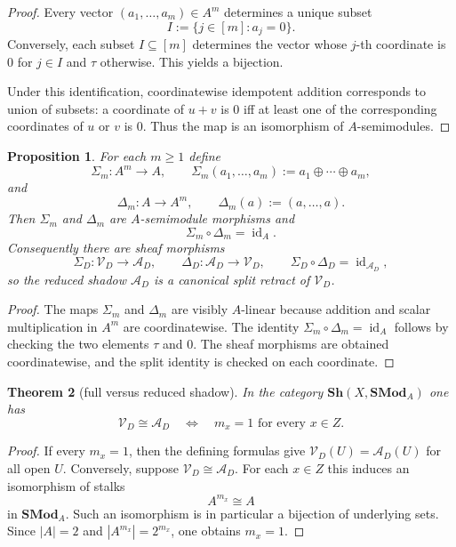\documentclass[11pt,a4paper]{article}
\newtheorem{theorem}{Theorem}[section]
\newtheorem{proposition}[theorem]{Proposition}
\theoremstyle{definition}
\theoremstyle{remark}
\DeclareMathOperator{\id}{id}
\newcommand{\SModA}{\mathbf{SMod}_A}
\newcommand{\taup}{\tau}
\newcommand{\Vd}{\mathcal V_D}
\newcommand{\Ad}{\mathcal A_D}
\begin{document}
\begin{proof}
Every vector $(a_1,\dots,a_m)\in A^m$ determines a unique subset
\[
I:=\{j\in[m]:a_j=0\}.
\]
Conversely, each subset $I\subseteq [m]$ determines the vector whose $j$-th coordinate is $0$ for $j\in I$ and $\taup$ otherwise. This yields a bijection.

Under this identification, coordinatewise idempotent addition corresponds to union of subsets: a coordinate of $u+v$ is $0$ iff at least one of the corresponding coordinates of $u$ or $v$ is $0$. Thus the map is an isomorphism of $A$-semimodules.
\end{proof}

\begin{proposition}\label{prop:split-retract}
For each $m\geq1$ define
\[
\Sigma_m:A^m\to A,
\qquad
\Sigma_m(a_1,\dots,a_m):=a_1\oplus\cdots\oplus a_m,
\]
and
\[
\Delta_m:A\to A^m,
\qquad
\Delta_m(a):=(a,\dots,a).
\]
Then $\Sigma_m$ and $\Delta_m$ are $A$-semimodule morphisms and
\[
\Sigma_m\circ\Delta_m=\id_A.
\]
Consequently there are sheaf morphisms
\[
\Sigma_D:\Vd\to\Ad,
\qquad
\Delta_D:\Ad\to\Vd,
\qquad
\Sigma_D\circ\Delta_D=\id_{\Ad},
\]
so the reduced shadow $\Ad$ is a canonical split retract of $\Vd$.
\end{proposition}

\begin{proof}
The maps $\Sigma_m$ and $\Delta_m$ are visibly $A$-linear because addition and scalar multiplication in $A^m$ are coordinatewise. The identity $\Sigma_m\circ\Delta_m=\id_A$ follows by checking the two elements $\taup$ and $0$.
The sheaf morphisms are obtained coordinatewise, and the split identity is checked on each coordinate.
\end{proof}

\begin{theorem}[full versus reduced shadow]\label{thm:full-vs-reduced}
In the category $\mathbf{Sh}(X,\SModA)$ one has
\[
\Vd\cong \Ad
\quad\Longleftrightarrow\quad
m_x=1\text{ for every }x\in Z.
\]
\end{theorem}

\begin{proof}
If every $m_x=1$, then the defining formulas give $\Vd(U)=\Ad(U)$ for all open $U$.
Conversely, suppose $\Vd\cong\Ad$. For each $x\in Z$ this induces an isomorphism of stalks
\[
A^{m_x}\cong A
\]
in $\SModA$. Such an isomorphism is in particular a bijection of underlying sets. Since $|A|=2$ and $|A^{m_x}|=2^{m_x}$, one obtains $m_x=1$.
\end{proof}
\end{document}
